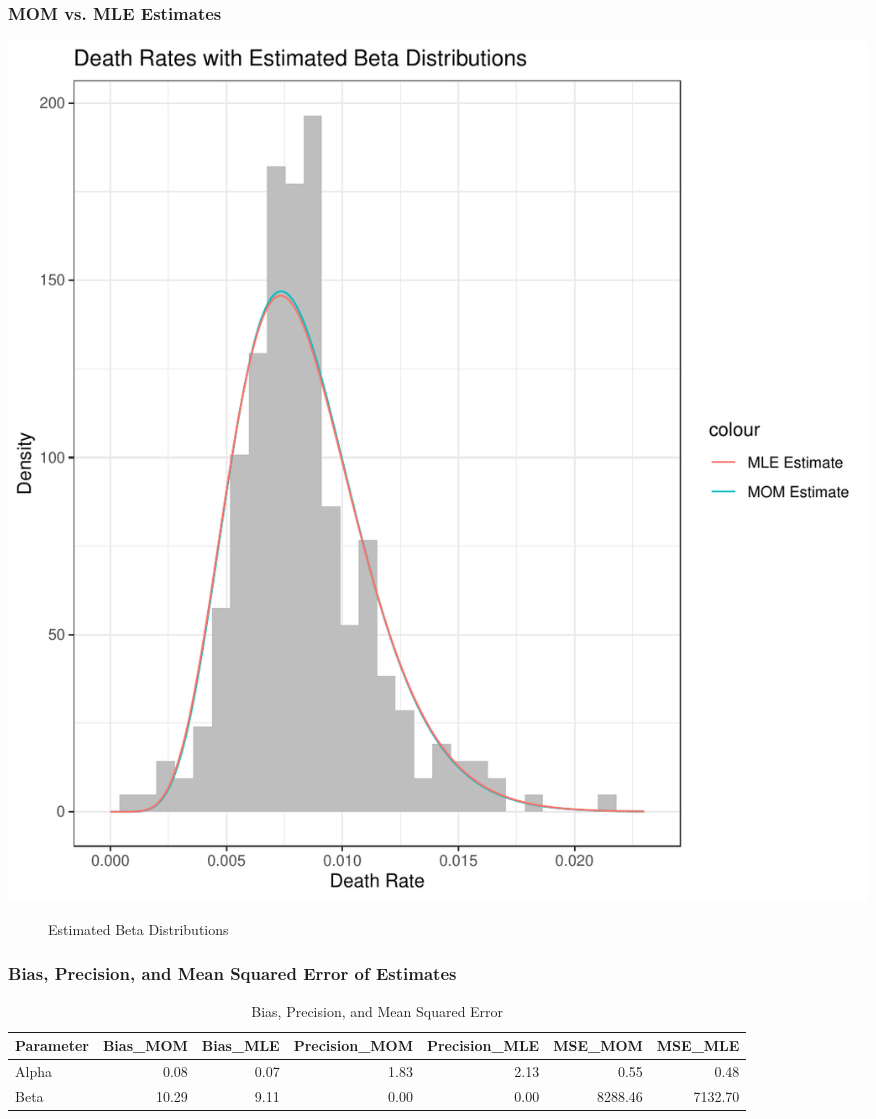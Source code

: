 \documentclass{article}\usepackage[]{graphicx}\usepackage[]{xcolor}
\makeatletter
\def\maxwidth{ %
  \ifdim\Gin@nat@width>\linewidth
    \linewidth
  \else
    \Gin@nat@width
  \fi
}
\newenvironment{knitrout}{}{} %
\makeatother
\begin{document}
\subsubsection{MOM vs. MLE Estimates}
\begin{knitrout}\scriptsize
{}\color{fgcolor}
\includegraphics[width=\maxwidth]{figure/plot5-1} 
\end{knitrout}
\begin{figure}[H]
\begin{center}

\caption{Estimated Beta Distributions}
\label{estimatedhistogram} %
\end{center}
\end{figure}

\pagebreak

\subsubsection{Bias, Precision, and Mean Squared Error of Estimates}

\begin{table}[H]
\centering
\begingroup\small
\begin{tabular}{lrrrrrr}
  \hline
Parameter & Bias\_MOM & Bias\_MLE & Precision\_MOM & Precision\_MLE & MSE\_MOM & MSE\_MLE \\ 
  \hline
Alpha & 0.08 & 0.07 & 1.83 & 2.13 & 0.55 & 0.48 \\ 
  Beta & 10.29 & 9.11 & 0.00 & 0.00 & 8288.46 & 7132.70 \\ 
   \hline
\end{tabular}
\endgroup
\caption{Bias, Precision, and Mean Squared Error} 
\label{biasprecision}
\end{table}
\end{document}
